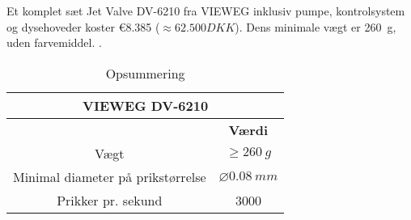 
Et komplet sæt Jet Valve DV-6210 fra VIEWEG inklusiv pumpe, kontrolsystem og dysehoveder koster €8.385 ($\approx 62.500 DKK$). Dens minimale vægt er \SI{260}{g}, uden farvemiddel. \parencite{VIEWEG2025JetDV-6210}. 


\renewcommand{\arraystretch}{1.3}
\begin{table}[H]
\setlength{\tabcolsep}{20pt}
 \centering
  \caption{Opsummering}
 \begin{tabular}{|c c|} \hline
 \multicolumn{2}{|c|}{\cellcolor{aaublue} \color{white} \textbf{VIEWEG DV-6210}}  \\\hline
 \rowcolor{gray!10} \multicolumn{1}{|c}{\textbf{Variabel}} &  \multicolumn{1}{c|}{\textbf{Værdi}}  \\\hline
 
 Vægt &  $\geq \SI{260}{g} $\\\hline
 Minimal diameter på prikstørrelse &  $\diameter\SI{0,08}{mm}$\\\hline
 Prikker pr. sekund &  3000 \\\hline
 \end{tabular}
 \label{tab: PeJV opsummering}
\end{table}

